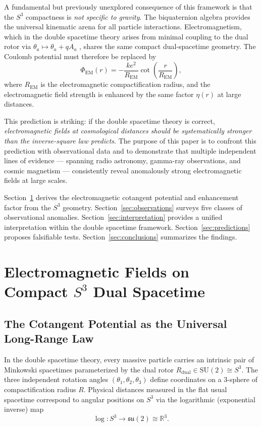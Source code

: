 \documentclass[a4paper]{article}
\begin{document}
A fundamental but previously unexplored consequence of this framework is that
the $S^3$ compactness is \emph{not specific to gravity}. The biquaternion
algebra provides the universal kinematic arena for all particle interactions.
Electromagnetism, which in the double spacetime theory arises from minimal
coupling to the dual rotor via $\theta_a \mapsto \theta_a + qA_a$
\cite{dst-main}, shares the same compact dual-spacetime geometry. The Coulomb
potential must therefore be replaced by
\[
\Phi_{\text{EM}}(r) = -\frac{ke^2}{R_{\text{EM}}}\cot\!\left(\frac{r}{R_{\text{EM}}}\right),
\]
where $R_{\text{EM}}$ is the electromagnetic compactification radius, and the
electromagnetic field strength is enhanced by the same factor $\eta(r)$ at large
distances.

This prediction is striking: if the double spacetime theory is correct,
\emph{electromagnetic fields at cosmological distances should be systematically
stronger than the inverse-square law predicts}. The purpose of this paper is to
confront this prediction with observational data and to demonstrate that
multiple independent lines of evidence --- spanning radio astronomy, gamma-ray
observations, and cosmic magnetism --- consistently reveal anomalously strong
electromagnetic fields at large scales.

Section~\ref{sec:theory} derives the electromagnetic cotangent potential and
enhancement factor from the $S^3$ geometry.
Section~\ref{sec:observations} surveys five classes of observational anomalies.
Section~\ref{sec:interpretation} provides a unified interpretation within the
double spacetime framework.
Section~\ref{sec:predictions} proposes falsifiable tests.
Section~\ref{sec:conclusions} summarizes the findings.

\section{Electromagnetic Fields on Compact $S^3$ Dual Spacetime}
\label{sec:theory}

\subsection{The Cotangent Potential as the Universal Long-Range Law}

In the double spacetime theory, every massive particle carries an intrinsic pair
of Minkowski spacetimes parameterized by the dual rotor
$R_{\text{dual}} \in \mathrm{SU}(2) \cong S^3$. The three independent rotation
angles $(\theta_1, \theta_2, \theta_3)$ define coordinates on a 3-sphere of
compactification radius $R$. Physical distances measured in the flat usual
spacetime correspond to angular positions on $S^3$ via the logarithmic
(exponential inverse) map
\[
\log : S^3 \to \mathfrak{su}(2) \cong \mathbb{R}^3.
\]
\end{document}
